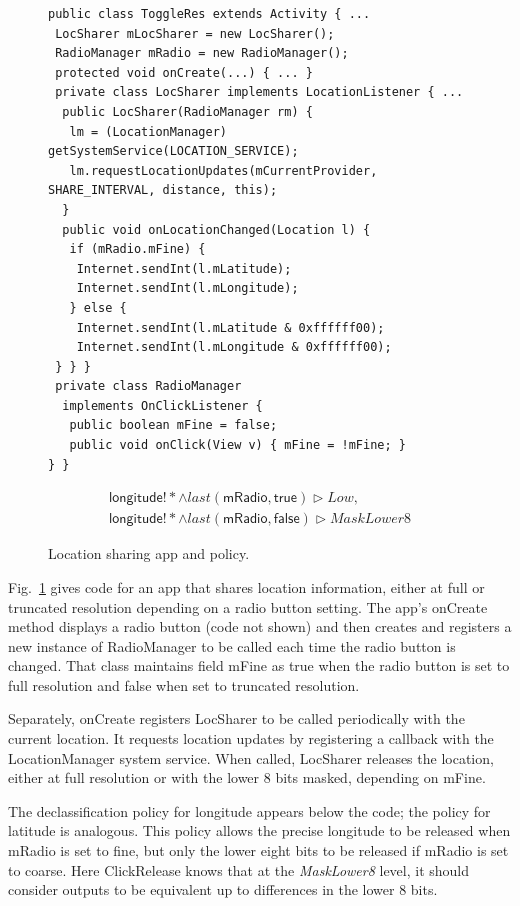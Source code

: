 \documentclass{llncs}
\newcommand{\code}[1]{\textsf{#1}} %
\newcommand{\toolname}{ClickRelease\xspace}
\newcommand{\tlast}[2]{\textit{last}(#1, #2)}
\begin{document}
\begin{figure}[t]
\centering
\begin{lstlisting}[name=Ex]
public class ToggleRes extends Activity { ...
 LocSharer mLocSharer = new LocSharer();
 RadioManager mRadio = new RadioManager();
 protected void onCreate(...) { ... }
 private class LocSharer implements LocationListener { ... 
  public LocSharer(RadioManager rm) {
   lm = (LocationManager) getSystemService(LOCATION_SERVICE);
   lm.requestLocationUpdates(mCurrentProvider, SHARE_INTERVAL, distance, this);
  }
  public void onLocationChanged(Location l) {
   if (mRadio.mFine) {
    Internet.sendInt(l.mLatitude);
    Internet.sendInt(l.mLongitude);
   } else {
    Internet.sendInt(l.mLatitude & 0xffffff00);
    Internet.sendInt(l.mLongitude & 0xffffff00);
 } } }
 private class RadioManager
  implements OnClickListener {
   public boolean mFine = false;
   public void onClick(View v) { mFine = !mFine; }
} }
\end{lstlisting}
  \begin{displaymath}
    \begin{array}{ll}
    \code{longitude}!\ast \wedge
    \tlast{\code{mRadio}}{\code{true}} \rhd
    \textit{Low}, \\
    \code{longitude}!\ast \wedge
    \tlast{\code{mRadio}}{\code{false}} \rhd
    \textit{MaskLower8}
    \end{array}
  \end{displaymath}
\caption{Location sharing app and policy.}
\label{fig:app-loc-toggle}
\end{figure}

Fig.~\ref{fig:app-loc-toggle} gives code for an app that
shares location information, either at full or truncated resolution
depending on a radio button setting. The app's \code{onCreate}
method displays a radio button (code not shown) and then creates and
registers a new instance of \code{RadioManager} to be called
each time the radio button is changed. That
class maintains field \code{mFine} as \code{true} when the radio button is
set to full resolution and \code{false} when set to truncated
resolution.

Separately, \code{onCreate} registers \code{LocSharer} to be called
periodically with the current location.  It requests location updates
by registering a callback with the \code{LocationManager}
system service.  When called, \code{LocSharer} releases the
location, either at full resolution or with the lower 8 bits
masked, depending on \code{mFine}.

The declassification policy for longitude appears below the code; the
policy for latitude is analogous.  This policy allows the precise
longitude to be released when
\code{mRadio} is set to fine, but only the lower eight bits to
be released if \code{mRadio} is set to coarse. Here \toolname{}
knows that at the \textit{MaskLower8} level, it should consider
outputs to be equivalent up to differences in the lower 8
bits. 
\end{document}
